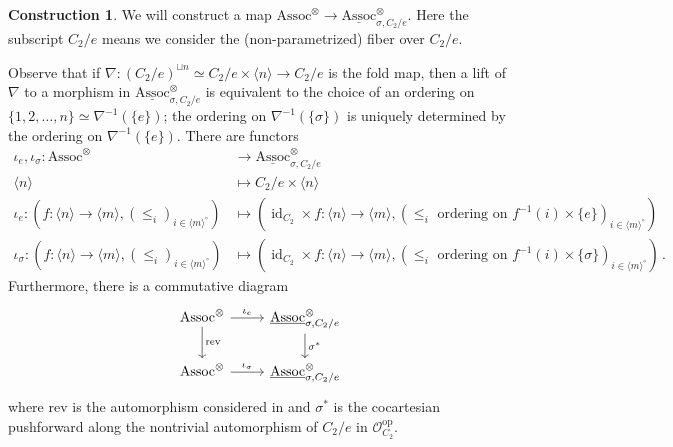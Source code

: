 \documentclass{article}
\DeclareMathOperator{\id}{id} %
\newcommand{\op}{\mathrm{op}}
\newcommand{\Assoc}{\mathrm{Assoc}}
\theoremstyle{definition}
\newtheorem{construction}[equation]{Construction}
\begin{document}
\begin{construction}
    We will construct a map $ \Assoc^\otimes \to \underline{\Assoc}^\otimes_{\sigma, C_2/e} $. 
    Here the subscript $ C_2/e $ means we consider the (non-parametrized) fiber over $ C_2/e $. 

    Observe that if $ \nabla \colon (C_2/e)^{\sqcup n} \simeq C_2/e \times \langle n \rangle \to C_2/e $ is the fold map, then a lift of $ \nabla $ to a morphism in $ \underline{\Assoc}^\otimes_{\sigma, C_2/e} $ is equivalent to the choice of an ordering on $ \{1,2, \ldots, n\} \simeq \nabla^{-1}(\{e\}) $; the ordering on $ \nabla^{-1}(\{\sigma\}) $ is uniquely determined by the ordering on $ \nabla^{-1}(\{e\}) $. 
    There are functors
    \begin{equation*}
    \begin{split}
        \iota_e, \iota_\sigma \colon \Assoc^\otimes &\to \underline{\Assoc}^\otimes_{\sigma, C_2/e} \\
        \langle n \rangle &\mapsto C_2/e \times \langle n \rangle \\
        \iota_e \colon \left(f \colon \langle n \rangle \to \langle m \rangle, (\leq_i)_{i \in \langle m \rangle^\circ}\right) & \mapsto \left(\id_{C_2} \times f \colon \langle n \rangle \to \langle m \rangle, (\leq_i \text{ ordering on }f^{-1}(i) \times \{e\})_{i \in \langle m \rangle^\circ}\right) \\
        \iota_\sigma \colon \left(f \colon \langle n \rangle \to \langle m \rangle, (\leq_i)_{i \in \langle m \rangle^\circ}\right) & \mapsto \left(\id_{C_2} \times f \colon \langle n \rangle \to \langle m \rangle, (\leq_i \text{ ordering on }f^{-1}(i) \times \{\sigma\})_{i \in \langle m \rangle^\circ}\right) \,.
    \end{split}
    \end{equation*} 
    Furthermore, there is a commutative diagram
    \begin{equation}
    \begin{tikzcd}
        \Assoc^\otimes \ar[d,"{\mathrm{rev}}"] \ar[r,"{\iota_e}"] & \underline{\Assoc}^\otimes_{\sigma, C_2/e} \ar[d,"{\sigma^*}"] \\
        \Assoc^\otimes \ar[r,"{\iota_\sigma}"] & \underline{\Assoc}^\otimes_{\sigma, C_2/e}
    \end{tikzcd}
    \end{equation} 
    where $ \mathrm{rev} $ is the automorphism considered in \cite[Remark 4.1.1.7]{LurHA} and $ \sigma^* $ is the cocartesian pushforward along the nontrivial automorphism of $ C_2/e $ in $ \mathcal{O}_{C_2}^\op $. 

\end{construction}
\end{document}
